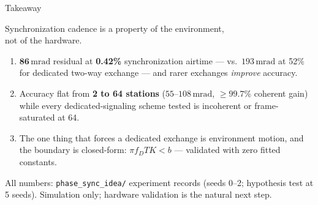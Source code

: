 \documentclass[aspectratio=169,10pt]{beamer}
\newcommand{\mrad}{\,\mathrm{mrad}}
\begin{document}
\begin{frame}{Takeaway}
  \begin{block}{}
    \centering\large
    Synchronization cadence is a property of the environment,\\
    not of the hardware.
  \end{block}
  \vspace{0.6em}
  \begin{enumerate}
    \item $\mathbf{86\mrad}$ residual at \textbf{0.42\%}
          synchronization airtime --- vs.\ $193\mrad$ at 52\% for
          dedicated two-way exchange --- and rarer exchanges
          \emph{improve} accuracy.
    \item Accuracy flat from \textbf{2 to 64 stations}
          ($55$--$108\mrad$, $\geq 99.7\%$ coherent gain) while every
          dedicated-signaling scheme tested is incoherent or
          frame-saturated at 64.
    \item The one thing that forces a dedicated exchange is
          environment motion, and the boundary is closed-form:
          $\pi f_D T K < b$ --- validated with zero fitted constants.
  \end{enumerate}
  \vspace{0.4em}
  \scriptsize All numbers: \texttt{phase\_sync\_idea/} experiment
  records (seeds 0--2; hypothesis test at 5 seeds). Simulation only;
  hardware validation is the natural next step.
\end{frame}
\end{document}
